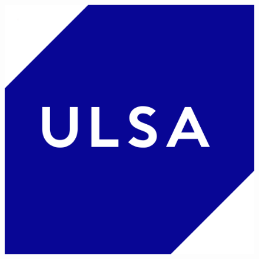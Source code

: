 
\begin{titlepage} %
\begin{figure}[!h]
\begin{center}
 \begin{minipage}[t]{0.5\textwidth}
    \includegraphics[valign=t,width=0.75\linewidth]{ULSA/Exts/logo.png}%
\end{minipage}%
\begin{minipage}[t]{0.5\textwidth}
    \begin{flushleft}
        \vspace{0.5cm}%
        \UlsaTitleFormattedAssociationHeader{}\\[1cm] %
        \UlsaTitleFormattedModuleInfo{} %
    \end{flushleft}%
\end{minipage}%
\end{center}%
\end{figure}%
\vspace*{2cm}
\begin{center}
    \begin{topbot}[linewidth=1mm]
        \centering
        \UlsaTitleFormattedTitle{} %
        \UlsaTitleFormattedSubtitle{} %
    \end{topbot}
\end{center}    


\end{titlepage}
